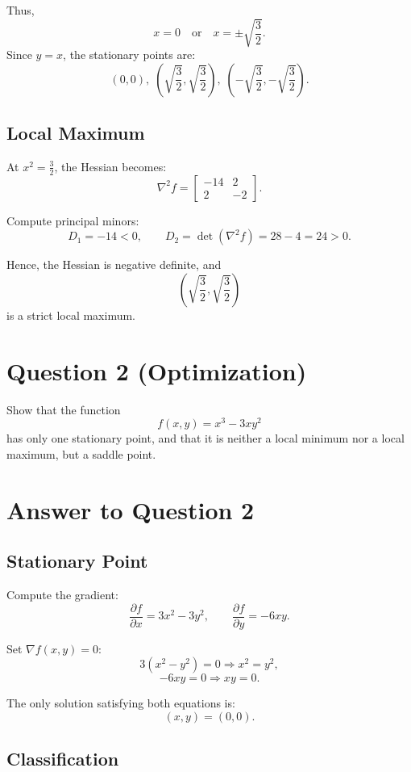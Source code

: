 \documentclass{article}
\begin{document}
Thus,
\[
x=0 \quad \text{or} \quad x=\pm\sqrt{\frac{3}{2}}.
\]
Since $y=x$, the stationary points are:
\[
(0,0),\;
\left(\sqrt{\frac{3}{2}},\sqrt{\frac{3}{2}}\right),\;
\left(-\sqrt{\frac{3}{2}},-\sqrt{\frac{3}{2}}\right).
\]

\subsection*{Local Maximum}

At $x^2=\frac{3}{2}$, the Hessian becomes:
\[
\nabla^2 f=
\begin{bmatrix}
-14 & 2\\
2 & -2
\end{bmatrix}.
\]

Compute principal minors:
\[
D_1=-14<0,
\qquad
D_2=\det(\nabla^2 f)=28-4=24>0.
\]

Hence, the Hessian is negative definite, and
\[
\left(\sqrt{\frac{3}{2}},\sqrt{\frac{3}{2}}\right)
\]
is a strict local maximum.

\newpage

\section*{Question 2 (Optimization)}

Show that the function
\[
f(x,y)=x^3-3xy^2
\]
has only one stationary point, and that it is neither a local minimum nor a local maximum, but a saddle point.

\section*{Answer to Question 2}

\subsection*{Stationary Point}

Compute the gradient:
\[
\frac{\partial f}{\partial x}=3x^2-3y^2,
\qquad
\frac{\partial f}{\partial y}=-6xy.
\]

Set $\nabla f(x,y)=0$:
\[
3(x^2-y^2)=0 \Rightarrow x^2=y^2,
\]
\[
-6xy=0 \Rightarrow xy=0.
\]

The only solution satisfying both equations is:
\[
(x,y)=(0,0).
\]

\subsection*{Classification}
\end{document}
